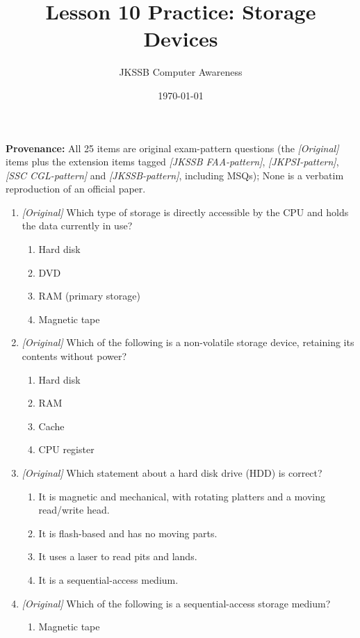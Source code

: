 \documentclass[11pt]{article}
\title{Lesson 10 Practice: Storage Devices}
\author{JKSSB Computer Awareness}
\date{\today}
\begin{document}
\maketitle
\noindent\textbf{Provenance:} All 25 items are original exam-pattern questions (the \textit{[Original]} items plus the extension items tagged \textit{[JKSSB FAA-pattern]}, \textit{[JKPSI-pattern]}, \textit{[SSC CGL-pattern]} and \textit{[JKSSB-pattern]}, including MSQs); None is a verbatim reproduction of an official paper.


\begin{enumerate}[label=\textbf{Q\arabic*.}, leftmargin=*]
\item \textit{[Original]} Which type of storage is directly accessible by the
  CPU and holds the data currently in use?
  \begin{enumerate}[label=\Alph*.]
    \item Hard disk
    \item DVD
    \item RAM (primary storage)
    \item Magnetic tape
  \end{enumerate}
\item \textit{[Original]} Which of the following is a non-volatile storage
  device, retaining its contents without power?
  \begin{enumerate}[label=\Alph*.]
    \item Hard disk
    \item RAM
    \item Cache
    \item CPU register
  \end{enumerate}
\item \textit{[Original]} Which statement about a hard disk drive (HDD) is
  correct?
  \begin{enumerate}[label=\Alph*.]
    \item It is magnetic and mechanical, with rotating platters and a moving
      read/write head.
    \item It is flash-based and has no moving parts.
    \item It uses a laser to read pits and lands.
    \item It is a sequential-access medium.
  \end{enumerate}
\item \textit{[Original]} Which of the following is a sequential-access
  storage medium?
  \begin{enumerate}[label=\Alph*.]
    \item Magnetic tape

\end{enumerate}
\end{enumerate}
\end{document}
